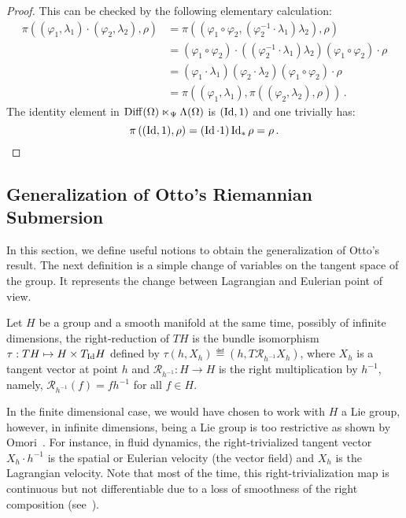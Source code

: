 \begin{proof}
  This can be checked by the following elementary calculation:
\begin{align*}
	\pi\left( (\varphi_1,\lambda_1) \cdot (\varphi_2,\lambda_2), \rho \right) 
	&= \pi \left((\varphi_1 \circ \varphi_2,( \varphi_2^{-1} \cdot \lambda_1) \lambda_2 ),\rho \right) \\ 
	& = (\varphi_1 \circ \varphi_2) \cdot (( \varphi_2^{-1} \cdot \lambda_1) \lambda_2 ) (\varphi_1 \circ \varphi_2) \cdot \rho \\ 
	& = (\varphi_1 \cdot \lambda_1) (\varphi_2 \cdot \lambda_2 )(\varphi_1\circ \varphi_2) \cdot \rho \\
	& = \pi \left( (\varphi_1,\lambda_1), \pi\left( (\varphi_2,\lambda_2), \rho \right) \right)\,.
\end{align*}
The identity element in $\operatorname{Diff}(\Omega) \ltimes_\Psi \Lambda(\Omega)$ is $(\operatorname{Id},1)$ and one trivially has:
\begin{equation*}
	\pi\left(  (\Id,1), \rho \right) =   (\Id \cdot 1)\Id_* \rho = \rho \,. %
\end{equation*}
\end{proof}

\subsection{Generalization of Otto's Riemannian Submersion} \label{sec:Submersion}

In this section, we define useful notions to obtain the generalization of Otto's result. %
The next definition is a simple change of variables on the tangent space of the group. It represents the change between Lagrangian and Eulerian point of view.
\begin{definition}
Let $H$ be a group and a smooth manifold at the same time, possibly of infinite dimensions, the right-reduction of $TH$ is the bundle isomorphism $\tau : T H \mapsto H \times T_{\operatorname{Id}} H$ defined by $\tau(h,X_h) \eqdef (h,T\mathcal{R}_{h^{-1}} X_h)$, where $X_h$ is a tangent vector at point $h$ and $\mathcal{R}_{h^{-1}}: H \to H$ is the right multiplication by $h^{-1}$, namely, $ \mathcal{R}_{h^{-1}}(f)= f h^{-1}$ for all $f \in H$.
\end{definition}
In the finite dimensional case, we would have chosen to work with $H$ a Lie group, however, in infinite dimensions, being a Lie group is too restrictive as shown by Omori~\cite{Omori1978}.
For instance, in fluid dynamics, the right-trivialized tangent vector $X_h \cdot h^{-1}$ is the spatial or Eulerian velocity (the vector field) and $X_h$ is the Lagrangian velocity.
Note that most of the time, this right-trivialization map is continuous but not differentiable due to a loss of smoothness of the right composition (see~\cite{em70}). 

